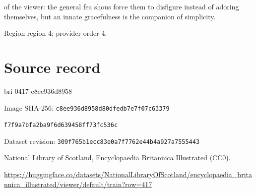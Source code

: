 \documentclass[11pt]{article}
\begin{document}
of the viewer: the general fea shous force them to disfigure instead of adoring themselves, but an innate gracefulness is the companion of simplicity.
\par

{\scriptsize\color{gray} Region region-4; provider order 4.\par}
\medskip
\newpage\section*{Source record}
bri-0417-c8ee936d8958\par
Image SHA-256: \texttt{c8ee936d8958d80dfedb7e7f07c63379}\par\texttt{f7f9a7bfa2ba9f6d639458ff73fc536c}\par
Dataset revision: \texttt{309f765b1ecc83e0a7f7}\texttt{762e44b4a927a7555443}\par
National Library of Scotland, Encyclopaedia Britannica Illustrated (CC0).\par
\url{https://huggingface.co/datasets/NationalLibraryOfScotland/encyclopaedia_britannica_illustrated/viewer/default/train?row=417}
\end{document}
